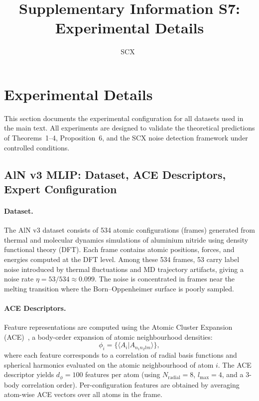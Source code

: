 \documentclass[article]{amsart}
\title{Supplementary Information S7: Experimental Details}
\author{SCX\ }
\theoremstyle{definition}
\begin{document}
\maketitle

\section{Experimental Details}

This section documents the experimental configuration for all datasets used in the main text. All experiments are designed to validate the theoretical predictions of Theorems~1--4, Proposition~6, and the SCX noise detection framework under controlled conditions.

\subsection{AlN v3 MLIP: Dataset, ACE Descriptors, Expert Configuration}

\paragraph{Dataset.}
The AlN v3 dataset consists of 534 atomic configurations (frames) generated from thermal and molecular dynamics simulations of aluminium nitride using density functional theory (DFT). Each frame contains atomic positions, forces, and energies computed at the DFT level. Among these 534 frames, 53 carry label noise introduced by thermal fluctuations and MD trajectory artifacts, giving a noise rate $\eta = 53/534 \approx 0.099$. The noise is concentrated in frames near the melting transition where the Born--Oppenheimer surface is poorly sampled.

\paragraph{ACE Descriptors.}
Feature representations are computed using the Atomic Cluster Expansion (ACE)~\cite{drautz2019ace}, a body-order expansion of atomic neighbourhood densities:
\begin{equation}
\phi_i = \bigl\{ \langle A_i | A_{n_1 n_2 l m} \rangle \bigr\},
\end{equation}
where each feature corresponds to a correlation of radial basis functions and spherical harmonics evaluated on the atomic neighbourhood of atom $i$. The ACE descriptor yields $d_\phi = 100$ features per atom (using $N_{\text{radial}} = 8$, $l_{\max} = 4$, and a 3-body correlation order). Per-configuration features are obtained by averaging atom-wise ACE vectors over all atoms in the frame.
\end{document}
